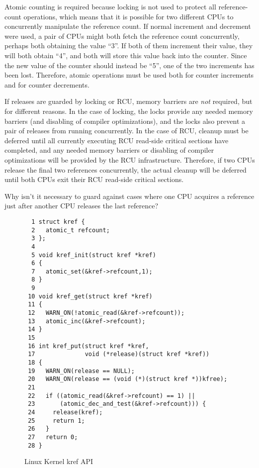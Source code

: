 Atomic counting is required
because locking is not used to protect all reference-count operations,
which means that it is possible for two different CPUs to concurrently
manipulate the reference count.
If normal increment and decrement were used, a pair of CPUs might both
fetch the reference count concurrently, perhaps both obtaining
the value ``3''.
If both of them increment their value, they will both obtain ``4'',
and both will store this value back into the counter.
Since the new value of the counter should instead be ``5'', one
of the two increments has been lost.
Therefore, atomic operations must be used both for counter increments
and for counter decrements.

If releases are guarded by locking or RCU,
memory barriers are \emph{not} required, but for different reasons.
In the case of locking, the locks provide any needed memory barriers
(and disabling of compiler optimizations), and the locks also
prevent a pair of releases from running concurrently.
In the case of RCU, cleanup must be deferred until all currently
executing RCU read-side critical sections have completed, and
any needed memory barriers or disabling of compiler optimizations
will be provided by the RCU infrastructure.
Therefore, if two CPUs release the final two references concurrently,
the actual cleanup will be deferred until both CPUs exit their
RCU read-side critical sections.

\QuickQuiz{}
	Why isn't it necessary to guard against cases where one CPU
	acquires a reference just after another CPU releases the last
	reference?
 \QuickQuizEnd

\begin{figure}[htbp]
{ \scriptsize
\begin{verbatim}
  1 struct kref {
  2   atomic_t refcount;
  3 };
  4
  5 void kref_init(struct kref *kref)
  6 {
  7   atomic_set(&kref->refcount,1);
  8 }
  9
 10 void kref_get(struct kref *kref)
 11 {
 12   WARN_ON(!atomic_read(&kref->refcount));
 13   atomic_inc(&kref->refcount);
 14 }
 15
 16 int kref_put(struct kref *kref,
 17              void (*release)(struct kref *kref))
 18 {
 19   WARN_ON(release == NULL);
 20   WARN_ON(release == (void (*)(struct kref *))kfree);
 21
 22   if ((atomic_read(&kref->refcount) == 1) ||
 23       (atomic_dec_and_test(&kref->refcount))) {
 24     release(kref);
 25     return 1;
 26   }
 27   return 0;
 28 }
\end{verbatim}
}
\caption{Linux Kernel kref API}
\label{fig:defer:Linux Kernel kref API}
\end{figure}

